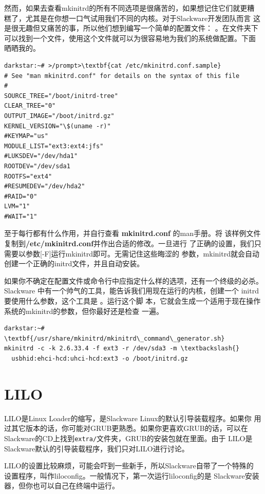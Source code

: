 然而，如果去查看mkinitrd的所有不同选项是很痛苦的，如果想记住它们就更糟
糕了，尤其是在你想一口气试用我们不同的内核。对于Slackware开发团队而言
这是很无趣但又痛苦的事，所以他们想到编写一个简单的配置文件：
。在文件夹下
可以找到一个文件，使用这个文件就可以为很容易地为我们的系统做配置。下面
晒晒我的。
\begin{Verbatim}[frame=single,commandchars=\\\{\}]
darkstar:~# >/prompt>\textbf{cat /etc/mkinitrd.conf.sample}
# See "man mkinitrd.conf" for details on the syntax of this file
#
SOURCE_TREE="/boot/initrd-tree"
CLEAR_TREE="0"
OUTPUT_IMAGE="/boot/initrd.gz"
KERNEL_VERSION="\$(uname -r)"
#KEYMAP="us"
MODULE_LIST="ext3:ext4:jfs"
#LUKSDEV="/dev/hda1"
ROOTDEV="/dev/sda1
ROOTFS="ext4"
#RESUMEDEV="/dev/hda2"
#RAID="0"
LVM="1"
#WAIT="1"
\end{Verbatim}
至于每行都有什么作用，并自行查看 \textbf{mkinitrd.conf} 的man手册。将
该样例文件复制到\textbf{/etc/mkinitrd.conf}并作出合适的修改。一旦进行
了正确的设置，我们只需要以参数[-F]运行mkinitrd即可。无需记住这些晦涩的
参数，mkinitrd就会自动创建一个正确的initrd文件，并且自动安装。

如果你不确定在配置文件或命令行中应指定什么样的选项，还有一个终级的必杀。
Slackware 中有一个帅气的工具，能告诉我们用现在运行的内核，创建一个
initrd要使用什么参数，这个工具是
。运行这个脚
本，它就会生成一个适用于现在操作系统的mkinitrd的参数，但你最好还是检查
一遍。
\begin{Verbatim}[frame=single, commandchars=\\\{\}]
darkstar:~# \textbf{/usr/share/mkinitrd/mkinitrd\_command\_generator.sh}
mkinitrd -c -k 2.6.33.4 -f ext3 -r /dev/sda3 -m \textbackslash{}
  usbhid:ehci-hcd:uhci-hcd:ext3 -o /boot/initrd.gz
\end{Verbatim}

\section{LILO}
\label{sec:booting:lilo}

LILO是Linux Loader的缩写，是Slackware Linux的默认引导装载程序。如果你
用过其它版本的话，你可能对GRUB更熟悉。如果你更喜欢GRUB的话，可以在
Slackware的CD上找到\texttt{extra/}文件夹，GRUB的安装包就在里面。由于
LILO是Slackware默认的引导装载程序，我们只对LILO进行讨论。

LILO的设置比较麻烦，可能会吓到一些新手，所以Slackware自带了一个特殊的
设置程序，叫作liloconfig。一般情况下，第一次运行liloconfig的是
Slackware安装器，但你也可以自己在终端中运行。

